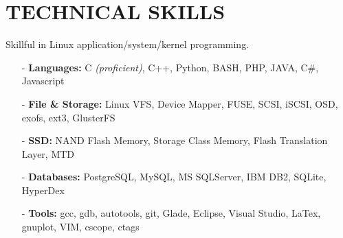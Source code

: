 \section{TECHNICAL SKILLS}
\vspace{0.03in}
Skillful in Linux application/system/kernel programming.
\begin{itemize}[leftmargin=*]
\setlength\itemsep{-0.02in}
\item[-] {\bf Languages:} C {\footnotesize \it (proficient)}, C++,
	Python, BASH, PHP, JAVA, C\#, Javascript
\item[-] {\bf File \& Storage:} Linux VFS, Device Mapper, FUSE, SCSI, iSCSI, OSD,
exofs, ext3, GlusterFS
\item[-] {\bf SSD:} NAND Flash Memory, Storage Class Memory,
	Flash Translation Layer, MTD %
\item[-] {\bf Databases:} PostgreSQL, MySQL, MS SQLServer, IBM DB2, SQLite, HyperDex
\item[-] {\bf Tools:} gcc, gdb, autotools, git, Glade, Eclipse, Visual Studio, LaTex, gnuplot,
                      VIM, cscope, ctags
\end{itemize}

